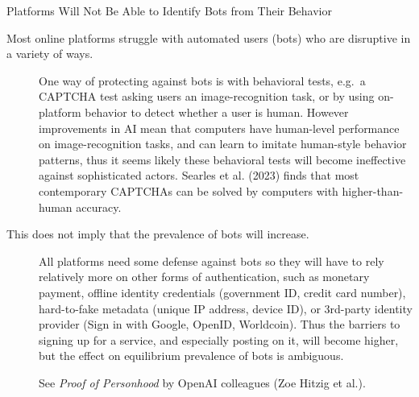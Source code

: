 \documentclass[
  10pt,
  ignorenonframetext,
]{beamer}
\begin{document}
\begin{frame}{Platforms Will Not Be Able to Identify Bots from Their
Behavior}
\label{platforms-will-not-be-able-to-identify-bots-from-their-behavior}
\begin{description}
\item[Most online platforms struggle with automated users (bots) who are
disruptive in a variety of ways.]
One way of protecting against bots is with behavioral tests, e.g.~a
CAPTCHA test asking users an image-recognition task, or by using
on-platform behavior to detect whether a user is human. However
improvements in AI mean that computers have human-level performance on
image-recognition tasks, and can learn to imitate human-style behavior
patterns, thus it seems likely these behavioral tests will become
ineffective against sophisticated actors. Searles et al. (2023) finds
that most contemporary CAPTCHAs can be solved by computers with
higher-than-human accuracy.
\item[This does not imply that the prevalence of bots will increase.]
All platforms need some defense against bots so they will have to rely
relatively more on other forms of authentication, such as monetary
payment, offline identity credentials (government ID, credit card
number), hard-to-fake metadata (unique IP address, device ID), or
3rd-party identity provider (Sign in with Google, OpenID, Worldcoin).
Thus the barriers to signing up for a service, and especially posting on
it, will become higher, but the effect on equilibrium prevalence of bots
is ambiguous.

See \emph{Proof of Personhood} by OpenAI colleagues (Zoe Hitzig et al.).
\end{description}
\end{frame}
\end{document}
